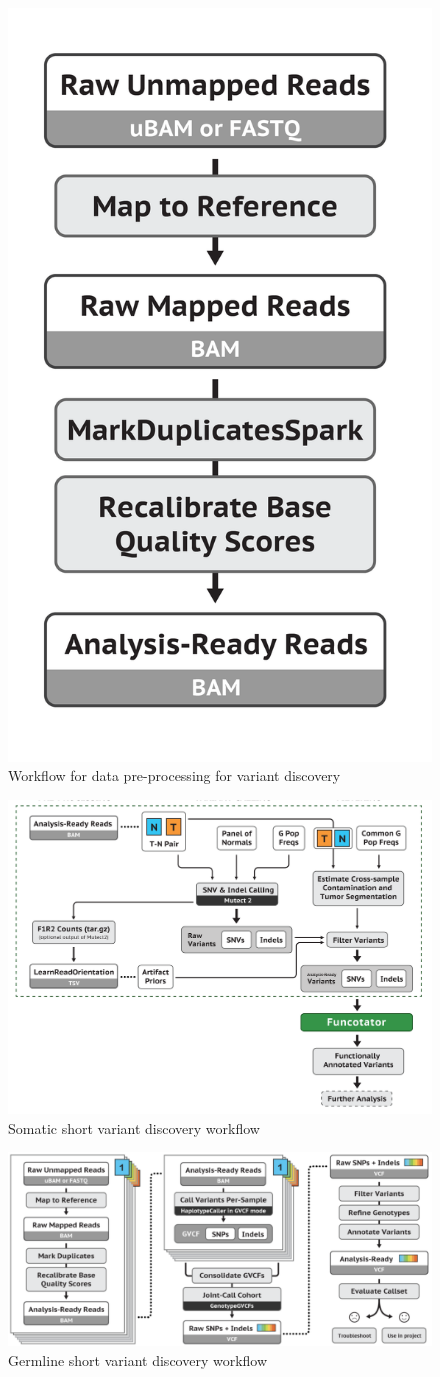 \documentclass[11pt,a4paper,onecolumn,oneside]{report}
\begin{document}
            \begin{figure}[p]
                \centering
                \includegraphics[width=0.3 \linewidth]{figures/Workflow/mapping.png}
                \caption{Workflow for data pre-processing for variant discovery \protect\cite{gatk1, gatk2}}
                \label{fig:workflow-preprocessing}
            \end{figure}

            \begin{figure}[p]
                \centering
                \includegraphics[width=0.8 \linewidth]{figures/Workflow/somatic_short_variants.png}
                \caption{Somatic short variant discovery workflow \protect\cite{gatk1, gatk2}}
                \label{fig:workflow-somatic}
            \end{figure}

            \begin{figure}[p]
                \centering
                \includegraphics[width=0.8 \linewidth]{figures/Workflow/germline_short_variant.png}
                \caption{Germline short variant discovery workflow \protect\cite{gatk1, gatk2}}
                \label{fig:workflow-germline}
            \end{figure}
\end{document}
